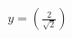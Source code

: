 \documentclass[preview]{standalone}
\begin{document}
\begin{align*}
y = \left(\frac{2}{\sqrt{2}}\right)
\end{align*}
\end{document}
